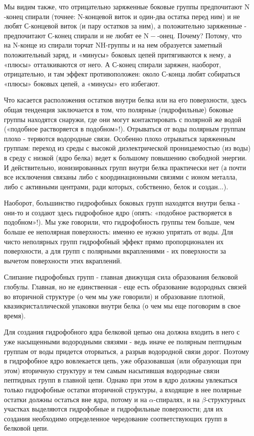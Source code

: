 \documentclass[
11pt,%
tightenlines,%
twoside,%
onecolumn,%
nofloats,%
nobibnotes,%
nofootinbib,%
superscriptaddress,%
noshowpacs,%
centertags]%
{revtex4}
\begin{document}
Мы видим также, что отрицательно заряженные боковые группы предпочитают $\mathrm{N}$-конец спирали (точнее: $\mathrm{N}$-концевой виток и один-два остатка перед ним) и не любят С-концевой виток (и пару остатков за ним), а положительно заряженные - предпочитают С-конец спирали и не любят ее $\mathrm{N}-$-онец. Почему? Потому, что на N-конце из спирали торчат NH-группы и на нем образуется заметный положительный заряд, и «минусы» боковых цепей притягиваются к нему, а «плюсы» отталкиваются от него. А С-конец спирали заряжен, наоборот, отрицательно, и там эффект противоположен: около С-конца любят собираться «плюсы» боковых цепей, а «минусы» его избегают.


Что касается расположения остатков внутри белка или на его поверхности, здесь общая тенденция заключается в том, что полярные (гидрофильные) боковые группы находятся снаружи, где они могут контактировать с полярной же водой («подобное растворяется в подобном»!). Отрываться от воды полярным группам плохо - теряются водородные связи. Особенно плохо отрываться заряженным группам: переход из среды с высокой диэлектрической проницаемостью (из воды) в среду с низкой (ядро белка) ведет к большому повышению свободной энергии. И действительно, ионизированных групп внутри белка практически нет (а почти все исключения связаны либо с координационными связями с ионом металла, либо с активными центрами, ради которых, собственно, белок и создан...).

Наоборот, большинство гидрофобных боковых групп находятся внутри белка - они-то и создают здесь гидрофобное ядро (опять: «подобное растворяется в подобном»!). Мы уже говорили, что гидрофобность группы тем больше, чем больше ее неполярная поверхность: именно ее нужно упрятать от воды. Для чисто неполярных групп гидрофобный эффект прямо пропорционален их поверхности, а для групп с полярными вкраплениями - их поверхности за вычетом поверхности этих вкраплений.

Слипание гидрофобных групп - главная движущая сила образования белковой глобулы. Главная, но не единственная - еще есть образование водородных связей во вторичной структуре (о чем мы уже говорили) и образование плотной, квазикристаллической упаковки внутри белка (о чем мы еще поговорим в свое время).

Для создания гидрофобного ядра белковой цепью она должна входить в него с уже насыщенными водородными связями - ведь иначе ее полярным пептидным группам от воды придется оторваться, а разрыв водородной связи дорог. Поэтому в гидрофобное ядро вовлекается цепь, уже образовавшая (или образующая при этом) вторичную структуру и тем самым насытившая водородные связи пептидных групп в главной цепи. Однако при этом в ядро должны увлекаться только гидрофобные остатки вторичной структуры, а входящие в нее полярные остатки должны остаться вне ядра, потому и на $\alpha$-спиралях, и на $\beta$-структурных участках выделяются гидрофобные и гидрофильные поверхности; для их создания необходимо определенное чередование соответствующих групп в белковой цепи.
\end{document}

